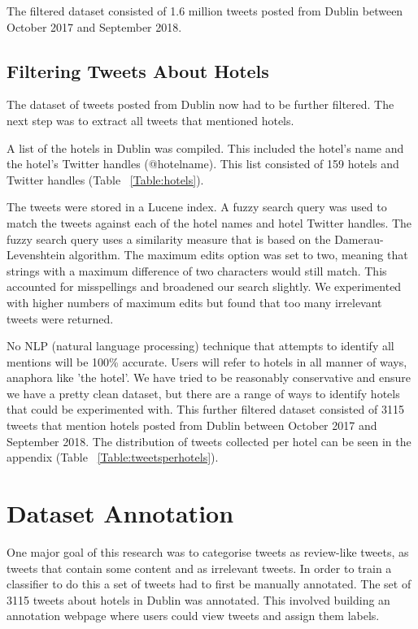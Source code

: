 The filtered dataset consisted of 1.6 million tweets posted from Dublin between October 2017 and September 2018.

\subsection{Filtering Tweets About Hotels}

The dataset of tweets posted from Dublin now had to be further filtered. The next step was to extract all tweets that mentioned hotels.

A list of the hotels in Dublin was compiled. This included the hotel's name and the hotel's Twitter handles (@hotelname). This list consisted of 159 hotels and Twitter handles (Table ~\ref{Table:hotels}).

The tweets were stored in a Lucene index. A fuzzy search query was used to match the tweets against each of the hotel names and hotel Twitter handles. The fuzzy search query uses a similarity measure that is based on the Damerau-Levenshtein algorithm. The maximum edits option was set to two, meaning that strings with a maximum difference of two characters would still match. This accounted for misspellings and broadened our search slightly. We experimented with higher numbers of maximum edits but found that too many irrelevant tweets were returned.

No NLP (natural language processing) technique that attempts to identify all mentions will be 100\% accurate. Users will refer to hotels in all manner of ways, anaphora like 'the hotel'. We have tried to be reasonably conservative and ensure we have a pretty clean dataset, but there are a range of ways to identify hotels that could be experimented with. 
This further filtered dataset consisted of 3115 tweets that mention hotels posted from Dublin between October 2017 and September 2018. The distribution of tweets collected per hotel can be seen in the appendix (Table ~\ref{Table:tweetsperhotels}).

\section{Dataset Annotation}

One major goal of this research was to categorise tweets as review-like tweets, as tweets that contain some content and as irrelevant tweets. In order to train a classifier to do this a set of tweets had to first be manually annotated. The set of 3115 tweets about hotels in Dublin was annotated. This involved building an annotation webpage where users could view tweets and assign them labels.

